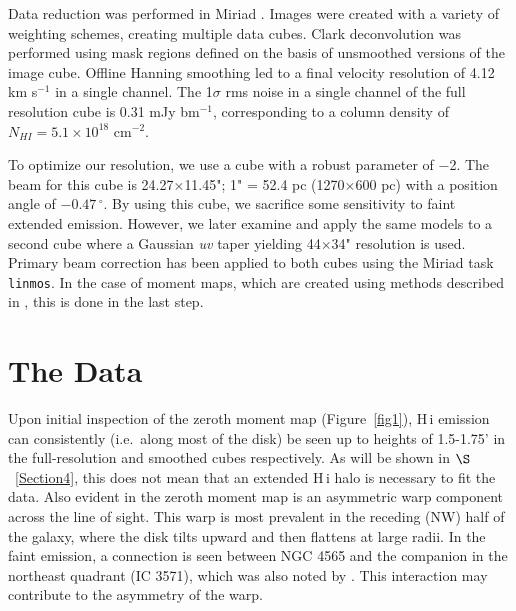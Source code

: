 \documentclass{emulateapj}
\begin{document}
\par
  Data reduction was performed in Miriad \citep{1995ASPC...77..433S}. Images were created with a variety of weighting schemes, creating multiple data cubes.  Clark deconvolution \citep{1980A&A....89..377C} was performed using mask regions defined on the basis of unsmoothed versions of the image cube.  Offline Hanning smoothing led to a final velocity resolution of 4.12 km s$^{-1}$ in a single channel.  The 1$\sigma$ rms noise in a single channel of the full resolution cube is 0.31 mJy bm$^{-1}$, corresponding to a column density of  $N_{HI}=5.1\times10^{18}$ cm$^{-2}$.

\par
    To optimize our resolution, we use a cube with a robust parameter of $-$2. The beam for this cube is 24.27$\times$11.45"; 1" = 52.4 pc (1270$\times$600 pc) with a position angle of $-0.47\,^{\circ}$.  By using this cube, we sacrifice some sensitivity to faint extended emission.  However, we later examine and apply the same models to a second cube where a Gaussian {\it uv} taper yielding 44$\times$34" resolution is used.  Primary beam correction has been applied to both cubes using the Miriad task {\tt linmos}.  In the case of moment maps, which are created using methods described in \citet{2012MNRAS.422.1835S}, this is done in the last step.  



\section{The Data} \label{Section3}


\par
    Upon initial inspection of the zeroth moment map (Figure~\ref{fig1}), {\sc H\,i} emission can consistently (i.e.\ along most of the disk) be seen up to heights of 1.5-1.75' in the full-resolution and smoothed cubes respectively.  As will be shown in $\S$~\ref{Section4}, this does not mean that an extended {\sc H\,i} halo is necessary to fit the data.  Also evident in the zeroth moment map is an asymmetric warp component across the line of sight.  This warp is most prevalent in the receding (NW) half of the galaxy, where the disk tilts upward and then flattens at large radii.  In the faint emission, a connection is seen between NGC 4565 and the companion in the northeast quadrant (IC 3571), which was also noted by \citet{2005ASPC..331..139V}.  This interaction may contribute to the asymmetry of the warp. 
\end{document}
